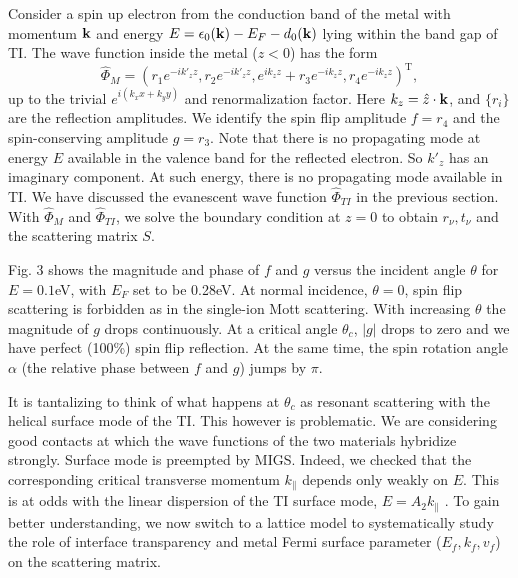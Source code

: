 Consider a spin up electron from the conduction band of the metal 
with momentum $\mathbf{k}$ and energy $E=
\epsilon_0(\mathbf{k})-E_F-d_0(\mathbf{k})$ lying within the band gap of TI.
The wave function inside the metal ($z<0$) has the form
\[
\hat{\Phi}_M=(r_1e^{-ik'_{z} z},r_2e^{-ik'_{z}z},e^{ik_{z}z}+r_3 e^{-ik_{z}z} ,r_4 e^{-ik_{z}z})^{\mathrm{T}},
\]
up to the trivial $e^{i(k_x x+k_y y)}$ and renormalization factor.
Here $k_z=\hat{z}\cdot\mathbf{k}$, and $\{r_i\}$ are the reflection amplitudes. We identify 
the spin flip amplitude $f=r_4$ and the spin-conserving amplitude $g=r_3$. Note that 
there is no propagating mode at energy $E$ available in the valence band 
for the reflected electron. So $k'_z$ has an imaginary component. 
%
At such energy, there is no propagating mode available in TI. We have discussed the 
evanescent wave function $\hat{\Phi}_{TI}$ in the previous section.
With $\hat{\Phi}_{M}$ and $\hat{\Phi}_{TI}$, we solve the boundary condition at $z=0$ 
to obtain $r_\nu, t_\nu$ and the scattering matrix $S$. 

Fig. 3 shows the magnitude and phase of $f$ and $g$ versus the incident angle $\theta$ for $E=0.1$eV, with $E_F$ set to be 0.28eV. At normal incidence, $\theta=0$, spin flip scattering
is forbidden as in the single-ion Mott scattering. With increasing $\theta$ the magnitude of $g$ drops continuously. At a critical angle $\theta_c$, $|g|$ drops to zero and we have perfect (100\%) spin flip reflection.
At the same time, the spin rotation angle $\alpha$ (the relative phase between $f$ and $g$)
jumps by $\pi$.

It is tantalizing to think of what happens at $\theta_c$ as resonant scattering
with the helical surface mode of the TI. This however is problematic.
We are considering good contacts at which the wave functions of the two materials hybridize strongly. 
Surface mode is preempted by MIGS. Indeed, we checked that the corresponding critical 
transverse momentum $k_\parallel$ depends only weakly on $E$. This is at odds with
the linear dispersion of the TI surface mode, $E=A_2k_\parallel$ \cite{zhang2009}. To gain better
understanding, we now switch to a lattice model to systematically study the role of interface 
transparency and metal Fermi surface parameter ($E_f, k_f, v_f$) on the scattering matrix. 



